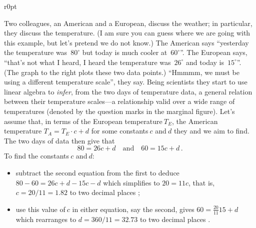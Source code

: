 \begin{wrapfigure}[8]r{0pt}
\end{wrapfigure}
\begin{example} \label{eg:infertemp}
Two colleagues, an American and a European, discuss the weather; in particular, they discuss the temperature.
(I am sure you can guess where we are going with this example, but let's pretend we do not know.)
The American says ``yesterday the temperature was~\(80^\circ\) but today is much cooler at~\(60^\circ\)''.
The European says, ``that's not what I heard, I heard the temperature was~\(26^\circ\) and today is~\(15^\circ\)''.
(The graph to the right plots these two data points.)
``Hmmmm, we must be using a different temperature scale'', they say.
Being scientists they start to use linear algebra to \emph{infer}, from the two days of temperature data, a general relation between their temperature scales---a relationship valid over a wide range of temperatures (denoted by the question marks in the marginal figure).
Let's assume that, in terms of the European temperature\(~T_E\), the American temperature \(T_A=T_E\cdot c+d\) for some constants\(~c\) and\(~d\) they and we aim to find.
The two days of data then give that
\begin{equation*}
80=26c+d\quad\text{and}\quad 60=15c+d\,.
\end{equation*}
To find the constants\(~c\) and\(~d\):
\begin{itemize}
\item subtract the second equation from the first to deduce \(80-60=26c+d-15c-d\) which simplifies to \(20=11c\), that is, \(c=20/11=1.82\) to two decimal places \twodp;
\item use this value of\(~c\) in either equation, say the second, gives \(60=\frac{20}{11}15+d\) which rearranges to \(d=360/11=32.73\)  to two decimal places \twodp.
\end{itemize}


\end{example}
